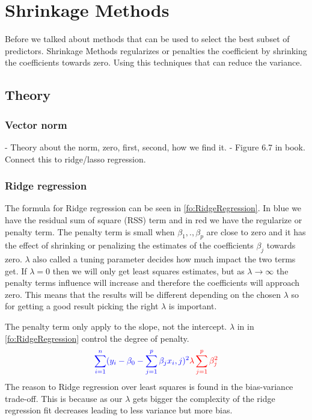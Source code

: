 \chapter{Shrinkage Methods} \label{ch:shrinkageMethods}
Before we talked about methods that can be used to select the best subset of predictors. Shrinkage Methods regularizes or penalties the coefficient by shrinking the coefficients towards zero. Using this techniques that can reduce the variance. 

\section{Theory}

\subsection{Vector norm}

- Theory about the norm, zero, first, second, how we find it.
- Figure 6.7 in book. Connect this to ridge/lasso regression.

\subsection{Ridge regression}

The formula for Ridge regression can be seen in \ref{fo:RidgeRegression}. In blue we have the residual sum of square (RSS) term and in red we have the regularize or penalty term. The penalty term is small when $\beta_1, . ,\beta_p$ are close to zero and it has the effect of shrinking or penalizing the estimates of the coefficients $\beta_j$ towards zero. $\lambda$ also called a tuning parameter decides how much impact the two terms get. If $\lambda = 0$ then we will only get least squares estimates, but as $ \lambda \to \infty$ the penalty terms influence will increase and therefore the coefficients will approach zero. This means that the results will be different depending on the chosen $\lambda$ so for getting a good result picking the right $\lambda$ is important.

\noindent The penalty term only apply to the slope, not the intercept. $\lambda$ in in \ref{fo:RidgeRegression} control the degree of penalty.
\begin{align}\label{fo:RidgeRegression}
\color{blue} \sum_{i=1}^{n} ( y_i - \beta_0 - \sum_{j=1}^{p} \beta_j x_i,j )^2  \color{red} \lambda \sum_{j=1}^{p} \beta^2_j 
\end{align}
The reason to Ridge regression over least squares is found in the bias-variance
trade-off. This is because as our $\lambda$ gets bigger the complexity of the ridge regression fit decreases leading to less variance but more bias.

